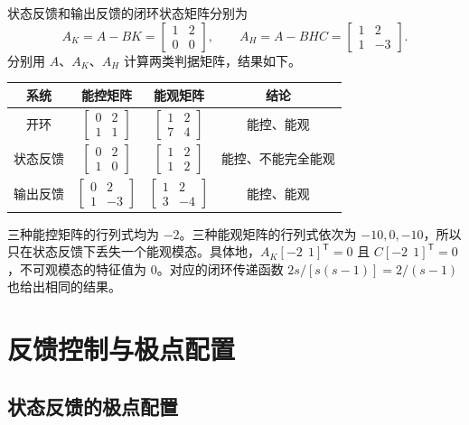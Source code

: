 \sol 状态反馈和输出反馈的闭环状态矩阵分别为
\[
    A_K=A-BK=\begin{bmatrix}1&2\\0&0\end{bmatrix},\qquad
    A_H=A-BHC=\begin{bmatrix}1&2\\1&-3\end{bmatrix}.
\]
分别用 $A$、$A_K$、$A_H$ 计算两类判据矩阵，结果如下。
\begin{center}
\begin{tabular}{c|c|c|c}
    系统 & 能控矩阵 & 能观矩阵 & 结论\\
    \hline
    开环 & $\begin{bmatrix}0&2\\1&1\end{bmatrix}$
         & $\begin{bmatrix}1&2\\7&4\end{bmatrix}$ & 能控、能观\\[6pt]
    状态反馈 & $\begin{bmatrix}0&2\\1&0\end{bmatrix}$
         & $\begin{bmatrix}1&2\\1&2\end{bmatrix}$ & 能控、不能完全能观\\[6pt]
    输出反馈 & $\begin{bmatrix}0&2\\1&-3\end{bmatrix}$
         & $\begin{bmatrix}1&2\\3&-4\end{bmatrix}$ & 能控、能观
\end{tabular}
\end{center}
三种能控矩阵的行列式均为 $-2$。三种能观矩阵的行列式依次为 $-10,0,-10$，所以只在状态反馈下丢失一个能观模态。具体地，$A_K[-2\ \ 1]^{\mathsf T}=0$ 且 $C[-2\ \ 1]^{\mathsf T}=0$，不可观模态的特征值为 $0$。对应的闭环传递函数 $2s/[s(s-1)]=2/(s-1)$ 也给出相同的结果。

\section{反馈控制与极点配置}

\subsection{状态反馈的极点配置}

